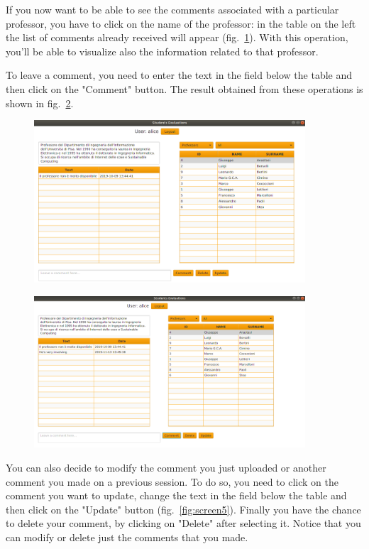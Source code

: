 \documentclass[a4paper]{article}
\begin{document}
If you now want to be able to see the comments associated with a particular professor, you have to click on the name of the professor: in the table on the left the list of comments already received will appear (fig.~\ref{fig:screen3}). With this operation, you'll be able to visualize also the information related to that professor.

To leave a comment, you need to enter the text in the field below the table and then click on the "Comment" button. The result obtained from these operations is shown in fig.~\ref{fig:screen4}.

\begin{figure}
\centering
\includegraphics[width=0.9\textwidth]{images/screens/screen3}
\label{fig:screen3}
\end{figure}

\begin{figure}
\centering
\includegraphics[width=0.9\textwidth]{images/screens/screen4}
\label{fig:screen4}
\end{figure}

You can also decide to modify the comment you just uploaded or another comment you made on a previous session. To do so, you need to click on the comment you want to update, change the text in the field below the table and then click on the "Update" button (fig.~\ref{fig:screen5}).
Finally you have the chance to delete your comment, by clicking on "Delete" after selecting it. Notice that you can modify or delete just the comments that you made.
\end{document}
